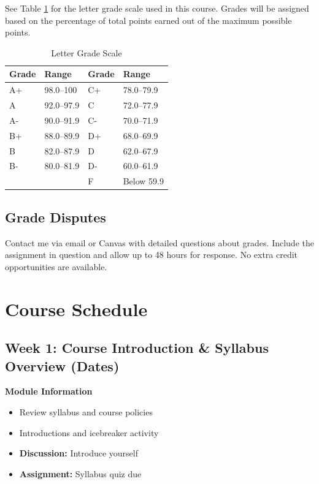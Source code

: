 \documentclass[12pt]{article}
\begin{document}
See Table \ref{tab:grading-scale} for the letter grade scale used in this course. Grades will be assigned based on the percentage of total points earned out of the maximum possible points.
\begin{table}[ht]
\caption{Letter Grade Scale}
\centering
\begin{tabular}{llll}
\toprule
\textbf{Grade} & \textbf{Range} & \textbf{Grade} & \textbf{Range} \\
\midrule
A+ & 98.0--100   & C+ & 78.0--79.9 \\
A  & 92.0--97.9  & C  & 72.0--77.9 \\
A- & 90.0--91.9  & C- & 70.0--71.9 \\
B+ & 88.0--89.9  & D+ & 68.0--69.9 \\
B  & 82.0--87.9  & D  & 62.0--67.9 \\
B- & 80.0--81.9  & D- & 60.0--61.9 \\
   &             & F  & Below 59.9 \\
\bottomrule
\end{tabular}
\label{tab:grading-scale}
\end{table}

\subsection*{Grade Disputes}
Contact me via email or Canvas with detailed questions about grades. Include the assignment in question and allow up to 48 hours for response. No extra credit opportunities are available.

\section*{Course Schedule}

\subsection*{Week 1: Course Introduction \& Syllabus Overview (Dates)}
\textbf{Module Information}
\begin{itemize}
\item Review syllabus and course policies
\item Introductions and icebreaker activity
\item \textbf{Discussion:} Introduce yourself
\item \textbf{Assignment:} Syllabus quiz due
\end{itemize}
\end{document}
